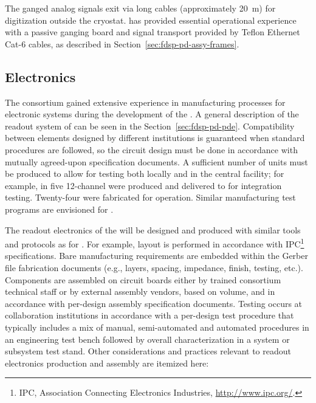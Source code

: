 The ganged analog signals exit via long cables (approximately \SI{20}{m}) for digitization outside the cryostat.
 has provided essential operational experience with a passive ganging board and signal transport provided by Teflon Ethernet Cat-6 cables, as described in Section~\ref{sec:fdsp-pd-assy-frames}.

\subsection{Electronics}
\label{sec:fdsp-pd-assy-pde}

The  consortium gained extensive experience in manufacturing processes for electronic systems during the development of the  .
A general description of the readout system of  can be seen in the Section~\ref{sec:fdsp-pd-pde}. Compatibility between elements designed by different institutions is guaranteed when standard procedures are followed, so the circuit design must be done in accordance with mutually agreed-upon specification documents.  A sufficient  number of units must be produced to allow %
for testing both locally and  in the central facility; for example, in  five 12-channel   were produced and delivered to  for integration testing. Twenty-four were fabricated for  operation. Similar manufacturing test programs are envisioned for .

The readout electronics of the  will be designed and produced with similar tools and protocols as for  . For example, %
 layout is performed in accordance with IPC\footnote{IPC\texttrademark{}, Association Connecting Electronics Industries, \url{http://www.ipc.org/}.} specifications. Bare  manufacturing requirements are embedded within the Gerber file 
fabrication documents (e.g., layers, spacing, impedance, finish, testing, etc.). Components are assembled on circuit boards either by trained  consortium technical staff or by external assembly vendors, based on volume, and in accordance with per-design assembly specification documents. Testing occurs at %
collaboration institutions in accordance with a per-design test procedure that typically includes a mix of manual, semi-automated and automated procedures %
in an engineering test bench followed by overall characterization in a system or subsystem test stand.
Other considerations and practices relevant to readout electronics production and assembly are itemized here:

